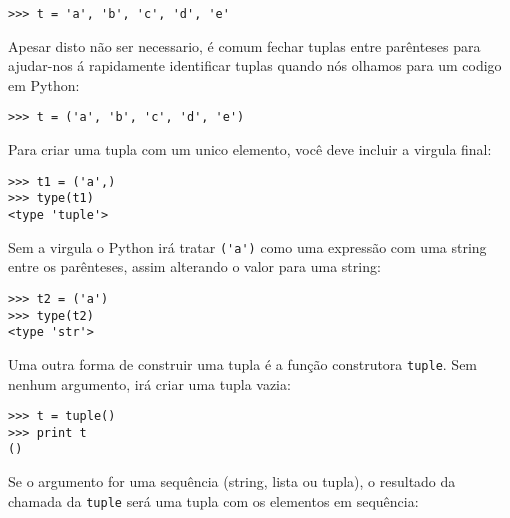 \beforeverb
\begin{verbatim}
>>> t = 'a', 'b', 'c', 'd', 'e'
\end{verbatim}
\afterverb
%
Apesar disto não ser necessario, é comum fechar tuplas entre parênteses
para ajudar-nos á rapidamente identificar tuplas quando nós olhamos
para um codigo em Python:


\beforeverb
\begin{verbatim}
>>> t = ('a', 'b', 'c', 'd', 'e')
\end{verbatim}
\afterverb
%
Para criar uma tupla com um unico elemento, você deve incluir a virgula
final:


\beforeverb
\begin{verbatim}
>>> t1 = ('a',)
>>> type(t1)
<type 'tuple'>
\end{verbatim}
\afterverb
%
Sem a virgula o Python irá tratar \verb"('a')" como uma expressão
com uma string entre os parênteses, assim alterando o valor para uma string:

\beforeverb
\begin{verbatim}
>>> t2 = ('a')
>>> type(t2)
<type 'str'>
\end{verbatim}
\afterverb
%
Uma outra forma de construir uma tupla é a função construtora {\tt tuple}.
Sem nenhum argumento, irá criar uma tupla vazia:


\beforeverb
\begin{verbatim}
>>> t = tuple()
>>> print t
()
\end{verbatim}
\afterverb
%
Se o argumento for uma sequência (string, lista ou tupla), o resultado
da chamada da {\tt tuple} será uma tupla com os elementos em sequência:

